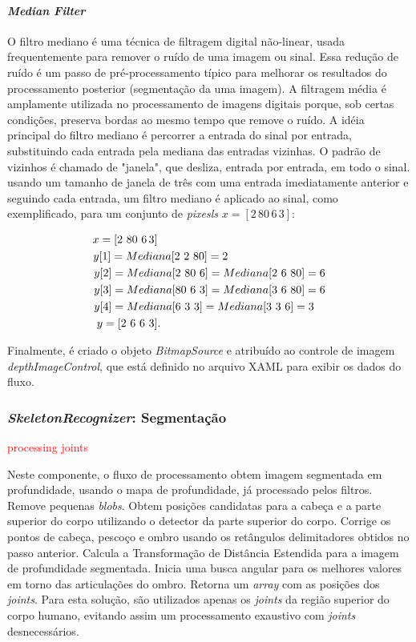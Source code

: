 \paragraph{\textit{Median Filter}}\label{sec:Mfilter}
O filtro mediano é uma técnica de filtragem digital não-linear, usada frequentemente para remover o ruído de uma imagem ou sinal. Essa redução de ruído é um passo de pré-processamento típico para melhorar os resultados do processamento posterior (segmentação da uma imagem). A filtragem média é amplamente utilizada no processamento de imagens digitais porque, sob certas condições, preserva bordas ao mesmo tempo que remove o ruído. A idéia principal do filtro mediano é percorrer a entrada do sinal por entrada, substituindo cada entrada pela mediana das entradas vizinhas. O padrão de vizinhos é chamado de "janela", que desliza, entrada por entrada, em todo o sinal. usando um tamanho de janela de três com uma entrada imediatamente anterior e seguindo cada entrada, um filtro mediano é aplicado ao  sinal, como exemplificado, para um conjunto de \textit{pixesls} $x = [2\,80\, 6 \,3]$:

\begin{align*}
x = [2\,\, 80\,\, 6 \,3]\MoveEqLeft[23]\\
y[1] = Mediana[2\,\, 2\,\, 80] = 2\MoveEqLeft[16.7]\\
y[2] = Mediana[2\,\, 80\,\, 6] = Mediana[2\,\, 6\,\, 80] = 6\MoveEqLeft[8]\\
y[3] = Mediana[80\,\, 6\,\, 3] = Mediana[3\,\, 6\,\, 80] = 6\MoveEqLeft[8]\\
y[4] = Mediana[6\,\, 3\,\, 3] = Mediana[3\,\, 3\,\, 6] = 3\MoveEqLeft[9]\\
y = [2\,\, 6\,\, 6\,\, 3]\MoveEqLeft[23].
\end{align*}

Finalmente, é criado o objeto \textit{BitmapSource} e atribuído ao controle de imagem \textit{depthImageControl}, que está definido no arquivo XAML para exibir os dados do fluxo.

\subsubsection{\textit{SkeletonRecognizer}: Segmentação}\label{sec:skeleton}
\textcolor{red}{processing joints}

Neste componente, o fluxo de processamento obtem imagem segmentada em profundidade, usando o mapa de profundidade, já processado pelos filtros. Remove pequenas \textit{blobs}. Obtem posições candidatas para a cabeça e a parte superior do corpo utilizando o detector da parte superior do corpo. Corrige os pontos de cabeça, pescoço e ombro usando os retângulos delimitadores obtidos no passo anterior. Calcula a Transformação de Distância Estendida para a imagem de profundidade segmentada. Inicia uma busca angular para os melhores valores em torno das articulações do ombro. Retorna um \textit{array} com as posições dos \textit{joints}. Para esta solução, são utilizados apenas os \textit{joints} da região superior do corpo humano, evitando assim um processamento exaustivo com \textit{joints} desnecessários.

